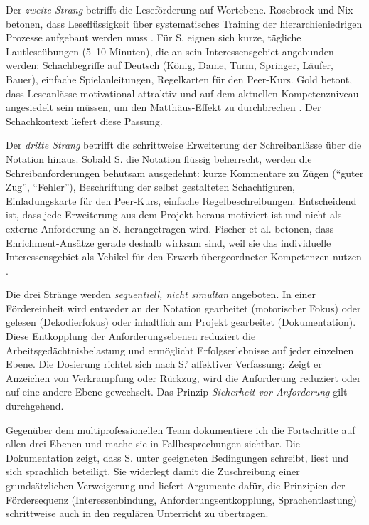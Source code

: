\documentclass[ngerman, a4paper]{article}
\begin{document}
Der \textit{zweite Strang} betrifft die Leseförderung auf Wortebene. Rosebrock und
Nix betonen, dass Leseflüssigkeit über systematisches Training der
hierarchieniedrigen Prozesse aufgebaut werden muss
\parencite{rosebrock2010grundlagen}. Für S. eignen sich kurze, tägliche
Lautleseübungen (5--10 Minuten), die an sein Interessensgebiet angebunden werden:
Schachbegriffe auf Deutsch (König, Dame, Turm, Springer, Läufer, Bauer),
einfache Spielanleitungen, Regelkarten für den Peer-Kurs. Gold betont, dass
Leseanlässe motivational attraktiv und auf dem aktuellen Kompetenzniveau
angesiedelt sein müssen, um den Matthäus-Effekt zu durchbrechen
\parencite{gold2018lesenkannmanlernen}. Der Schachkontext liefert diese Passung.

Der \textit{dritte Strang} betrifft die schrittweise Erweiterung der
Schreibanlässe über die Notation hinaus. Sobald S. die Notation flüssig beherrscht,
werden die Schreibanforderungen behutsam ausgedehnt: kurze Kommentare zu
Zügen (\enquote{guter Zug}, \enquote{Fehler}), Beschriftung der selbst gestalteten
Schachfiguren, Einladungskarte für den Peer-Kurs, einfache Regelbeschreibungen.
Entscheidend ist, dass jede Erweiterung aus dem Projekt heraus motiviert ist
und nicht als externe Anforderung an S. herangetragen wird. Fischer et al.
betonen, dass Enrichment-Ansätze gerade deshalb wirksam sind, weil sie das
individuelle Interessensgebiet als Vehikel für den Erwerb übergeordneter
Kompetenzen nutzen \parencite{fischer2020begabungsfoerderung}.

Die drei Stränge werden \textit{sequentiell, nicht simultan} angeboten. In einer
Fördereinheit wird entweder an der Notation gearbeitet (motorischer Fokus)
oder gelesen (Dekodierfokus) oder inhaltlich am Projekt gearbeitet
(Dokumentation). Diese Entkopplung der Anforderungsebenen reduziert die
Arbeitsgedächtnisbelastung und ermöglicht Erfolgserlebnisse auf jeder
einzelnen Ebene. Die Dosierung richtet sich nach S.' affektiver Verfassung:
Zeigt er Anzeichen von Verkrampfung oder Rückzug, wird die Anforderung
reduziert oder auf eine andere Ebene gewechselt. Das Prinzip
\textit{Sicherheit vor Anforderung} gilt durchgehend.

Gegenüber dem multiprofessionellen Team dokumentiere ich die Fortschritte
auf allen drei Ebenen und mache sie in Fallbesprechungen sichtbar. Die
Dokumentation zeigt, dass S. unter geeigneten Bedingungen schreibt, liest
und sich sprachlich beteiligt. Sie widerlegt damit die Zuschreibung einer
grundsätzlichen Verweigerung und liefert Argumente dafür, die Prinzipien
der Fördersequenz (Interessenbindung, Anforderungsentkopplung,
Sprachentlastung) schrittweise auch in den regulären Unterricht zu übertragen.
\end{document}
